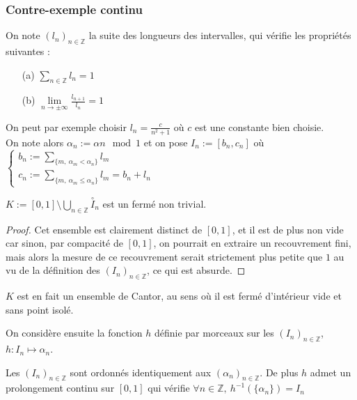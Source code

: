 \documentclass[11pt,a4paper]{article}
\begin{document}
\subsubsection{Contre-exemple continu} 

On note $(l_n)_{n\in \mathbb{Z}}$ la suite des longueurs des intervalles,  qui vérifie les propriétés suivantes : 
\begin{enumerate}

\item[(a)] $\displaystyle \sum_{n\in \mathbb{Z}} l_n = 1$ 

\item[(b)]$\displaystyle \lim\limits_{n \to \pm \infty } \frac{l_{n+1}}{l_n} = 1 $

\end{enumerate} On peut par exemple choisir $l_n = \displaystyle \frac{c}{n^2 + 1}$ où $c$ est une constante bien choisie. \\
On note alors $ \alpha_n := \alpha n \mod 1$ et on pose $I_n := [b_n , c_n]$ où $\begin{cases} b_n := \displaystyle \sum_{\{m, \ \alpha_m < \alpha_n\}} l_m \\ c_n := \displaystyle \sum_{\{m, \ \alpha_m \leq \alpha_n\}} l_m  = b_n + l_n \end{cases}$ \\


\begin{lemma}\label{cantor}
$\displaystyle K := [0,1] \setminus \bigcup_{n\in \mathbb{Z}} \overset{\circ}I_n$ est un fermé non trivial.
\end{lemma}

\begin{proof}
Cet ensemble est clairement distinct de $[0,1]$, et il est de plus non vide car sinon, par compacité de $[0,1]$, on pourrait en extraire un recouvrement fini, mais alors la mesure de ce recouvrement serait strictement plus petite que $1$ au vu de la définition des $(I_n)_{n\in\mathbb{Z}}$, ce qui est absurde. 
\end{proof}


\begin{rmq}
$K$ est en fait un ensemble de Cantor, au sens où il est fermé d'intérieur vide et sans point isolé.
\end{rmq}

On considère ensuite la fonction $h$ définie par morceaux sur les $(I_n)_{n\in\mathbb{Z}}$, $h : I_n \mapsto \alpha_n$. 

\begin{lemma} 
Les $(I_n)_{n\in\mathbb{Z}}$ sont ordonnés identiquement aux $(\alpha_n)_{n\in\mathbb{Z}}$. De plus $h$ admet un prolongement continu sur $[0,1]$ qui vérifie $\forall n \in \mathbb{Z},\  h^{-1}(\{\alpha_n\})=I_n$
\end{lemma}
\end{document}
